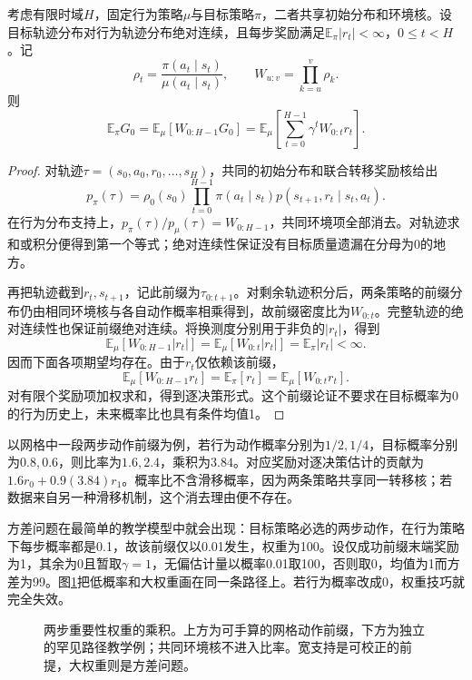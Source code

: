 \begin{theorem}[轨迹与逐决策重要性校正]
  \label{thm:rl-learning-importance-sampling}
  考虑有限时域$H$，固定行为策略$\mu$与目标策略$\pi$，二者共享初始分布和环境核。设目标轨迹分布对行为轨迹分布绝对连续，且每步奖励满足$\mathbb E_\pi|r_t|<\infty$，$0\leq t<H$。记
  \[
    \rho_t=\frac{\pi(a_t\mid s_t)}{\mu(a_t\mid s_t)},\qquad
    W_{u:v}=\prod_{k=u}^{v}\rho_k .
  \]
  则
  \begin{equation}
    \mathbb E_\pi G_0
       =\mathbb E_\mu[W_{0:H-1}G_0]
       =\mathbb E_\mu\left[\sum_{t=0}^{H-1}
                           \gamma^t W_{0:t}r_t\right].
    \label{eq:rl-learning-is}
  \end{equation}
\end{theorem}
\begin{proof}
  对轨迹$\tau=(s_0,a_0,r_0,\ldots,s_H)$，共同的初始分布和联合转移奖励核给出
  \[
    p_\pi(\tau)=\rho_0(s_0)\prod_{t=0}^{H-1}
         \pi(a_t\mid s_t)p(s_{t+1},r_t\mid s_t,a_t).
  \]
  在行为分布支持上，$p_\pi(\tau)/p_\mu(\tau)=W_{0:H-1}$，共同环境项全部消去。对轨迹求和或积分便得到第一个等式；绝对连续性保证没有目标质量遗漏在分母为0的地方。

  再把轨迹截到$r_t,s_{t+1}$，记此前缀为$\tau_{0:t+1}$。对剩余轨迹积分后，两条策略的前缀分布仍由相同环境核与各自动作概率相乘得到，故前缀密度比为$W_{0:t}$。完整轨迹的绝对连续性也保证前缀绝对连续。将换测度分别用于非负的$|r_t|$，得到
  \[
    \mathbb E_\mu[W_{0:H-1}|r_t|]
    =\mathbb E_\mu[W_{0:t}|r_t|]
    =\mathbb E_\pi|r_t|<\infty.
  \]
  因而下面各项期望均存在。由于$r_t$仅依赖该前缀，
  \[
    \mathbb E_\mu[W_{0:H-1}r_t]
    =\mathbb E_\pi[r_t]
    =\mathbb E_\mu[W_{0:t}r_t].
  \]
  对有限个奖励项加权求和，得到逐决策形式。这个前缀论证不要求在目标概率为0的行为历史上，未来概率比也具有条件均值1。
\end{proof}

以网格中一段两步动作前缀为例，若行为动作概率分别为$1/2,1/4$，目标概率分别为$0.8,0.6$，则比率为$1.6,2.4$，乘积为$3.84$。对应奖励对逐决策估计的贡献为$1.6r_0+0.9(3.84)r_1$。概率比不含滑移概率，因为两条策略共享同一转移核；若数据来自另一种滑移机制，这个消去理由便不存在。

方差问题在最简单的教学模型中就会出现：目标策略必选的两步动作，在行为策略下每步概率都是0.1，故该前缀仅以0.01发生，权重为100。设仅成功前缀末端奖励为1，其余为0且暂取$\gamma=1$，无偏估计量以概率0.01取100，否则取0，均值为1而方差为99。图\ref{fig:rl-learning-is-sampling}把低概率和大权重画在同一条路径上。若行为概率改成0，权重技巧就完全失效。

\begin{figure}[htbp]
  \centering
  
  \caption{两步重要性权重的乘积。上方为可手算的网格动作前缀，下方为独立的罕见路径教学例；共同环境核不进入比率。宽支持是可校正的前提，大权重则是方差问题。}
  \label{fig:rl-learning-is-sampling}
\end{figure}

